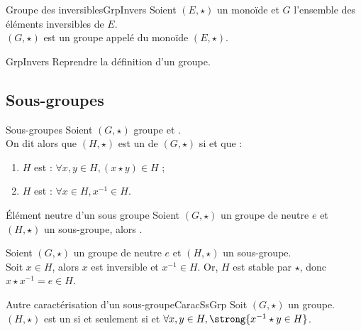 \documentclass[12pt,a4paper]{report}
\begin{document}
    \begin{proposition}{Groupe des inversibles}{GrpInvers}
    Soient $(E, \star)$ un monoïde et $G$ l'ensemble des éléments inversibles de $E$.\\
    $(G, \star)$ est un groupe appelé  du monoïde $(E, \star)$.
    \end{proposition}
    
    \begin{principedemo}{GrpInvers}
    Reprendre la définition d'un groupe.
    \end{principedemo}
    
    \pagebreak
    
    \subsection{Sous-groupes}
    
    \begin{definition}{Sous-groupes}{}
    Soient $(G, \star)$ groupe et .\\
    On dit alors que $(H, \star)$ est un  de $(G, \star)$ si  et que :
    \begin{enumerate}[label=\bfseries\arabic*)]
        \item $H$ est  : $\forall x, y \in H, (x \star y) \in H$ ;
        \item $H$ est  : $\forall x \in H, x^{-1} \in H$.
    \end{enumerate}
    \end{definition}
    
    \begin{proposition}{Élément neutre d'un sous groupe}{}
    Soient $(G, \star)$ un groupe de neutre $e$ et $(H, \star)$ un sous-groupe, alors .
    \end{proposition}
    
    \begin{demo}
    Soient $(G, \star)$ un groupe de neutre $e$ et $(H, \star)$ un sous-groupe.\\
    Soit $x \in H$, alors $x$ est inversible et $x^{-1} \in H$. Or, $H$ est stable par $\star$, donc $x \star x^{-1} = e \in H$.
    \end{demo}
    
    \begin{proposition}{Autre caractérisation d'un sous-groupe}{CaracSsGrp}
    Soit $(G, \star)$ un groupe.\\
    $(H, \star)$ est un  si et seulement si  et $\forall x, y \in H, \strong{x^{-1} \star y \in H}$.
    \end{proposition}
    
\end{document}
